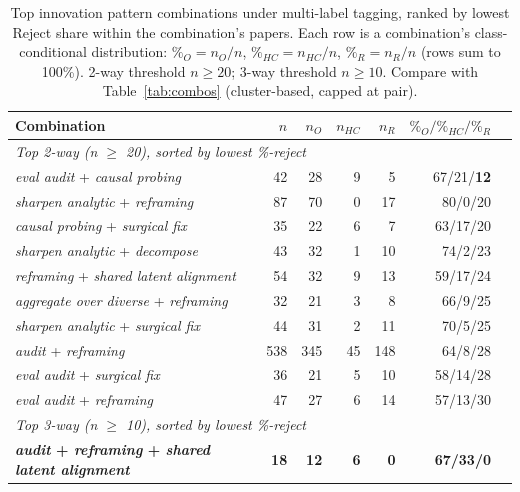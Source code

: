 \documentclass[10pt,a4paper]{article}
\begin{document}
\begin{table}[htbp]
\centering
\caption{Top innovation pattern combinations under multi-label tagging, ranked by lowest Reject share within the combination's papers. Each row is a combination's class-conditional distribution: \(\%_O = n_O/n\), \(\%_{HC} = n_{HC}/n\), \(\%_R = n_R/n\) (rows sum to 100\%). 2-way threshold \(n \geq 20\); 3-way threshold \(n \geq 10\). Compare with Table~\ref{tab:combos} (cluster-based, capped at pair).}
\label{tab:multilabel_combos}
\small
\begin{tabular}{p{8.4cm} r r r r r r}
\toprule
\textbf{Combination} & \(n\) & \(n_O\) & \(n_{HC}\) & \(n_R\) & \(\%_O / \%_{HC} / \%_R\) \\
\midrule
\multicolumn{6}{l}{\textit{Top 2-way (n \(\geq\) 20), sorted by lowest \%-reject}} \\
\midrule
\textit{eval audit} + \textit{causal probing}                                   &  42 &  28 &  9 &   5 & 67/21/\textbf{12} \\
\textit{sharpen analytic} + \textit{reframing}                                  &  87 &  70 &  0 &  17 & 80/0/20 \\
\textit{causal probing} + \textit{surgical fix}                                 &  35 &  22 &  6 &   7 & 63/17/20 \\
\textit{sharpen analytic} + \textit{decompose}                                  &  43 &  32 &  1 &  10 & 74/2/23 \\
\textit{reframing} + \textit{shared latent alignment}                           &  54 &  32 &  9 &  13 & 59/17/24 \\
\textit{aggregate over diverse} + \textit{reframing}                            &  32 &  21 &  3 &   8 & 66/9/25 \\
\textit{sharpen analytic} + \textit{surgical fix}                               &  44 &  31 &  2 &  11 & 70/5/25 \\
\textit{audit} + \textit{reframing}                                             & 538 & 345 & 45 & 148 & 64/8/28 \\
\textit{eval audit} + \textit{surgical fix}                                     &  36 &  21 &  5 &  10 & 58/14/28 \\
\textit{eval audit} + \textit{reframing}                                        &  47 &  27 &  6 &  14 & 57/13/30 \\
\midrule
\multicolumn{6}{l}{\textit{Top 3-way (n \(\geq\) 10), sorted by lowest \%-reject}} \\
\midrule
\textbf{\textit{audit} + \textit{reframing} + \textit{shared latent alignment}} &  \textbf{18} &  \textbf{12} &   \textbf{6} &   \textbf{0} & \textbf{67/33/0} \\

\end{tabular}
\end{table}
\end{document}
